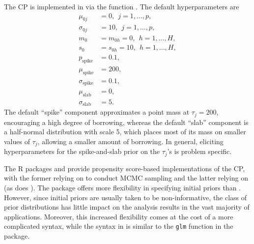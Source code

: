 The CP is implemented in  via the function .
The default hyperparameters are
\begin{align*}
    \mu_{0j} &= 0, \ \ j = 1, \ldots, p
    ,\\
    \sigma_{0j} &= 10, \ \ j = 1, \ldots, p
    ,\\
    m_0 &= m_{0h} = 0, \ \ h = 1, \ldots, H
    , \\
    s_0 &= s_{0h} = 10, \ \ h = 1, \ldots, H
    , \\
    p_{\text{spike}} &= 0.1
    ,\\
     \mu_{\text{spike}} &= 200
    ,\\
    \sigma_{\text{spike}} &= 0.1
    , \\
    \mu_{\text{slab}} &= 0
    , \\
    \sigma_{\text{slab}} &= 5.
\end{align*}
The default ``spike'' component approximates a point mass at $\tau_j = 200$, encouraging a high degree of borrowing, whereas the default ``slab'' component is a half-normal distribution with scale 5, which places most of its mass on smaller values of $\tau_j$, allowing a smaller amount of borrowing. In general, eliciting hyperparameters for the spike-and-slab prior on the $\tau_j$'s is problem specific.

The R packages  \citep{psborrow_pkg} and  \citep{psborrow2_pkg} provide propensity score-based implementations of the CP, with the former relying on  to conduct MCMC sampling and the latter relying on  (as does ). 
The  package offers more flexibility in specifying initial priors than . However, since initial priors are usually taken to be non-informative, the class of prior distributions has little impact on the analysis results in the vast majority of applications.
Moreover, this increased flexibility comes at the cost of a more complicated syntax, while the syntax in  is similar to the \texttt{glm} function in the  package.

